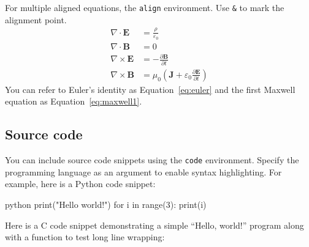 For multiple aligned equations, the \texttt{align} environment. Use \texttt{\&} to mark the alignment point.
\begin{align}
    \label{eq:maxwell1}
    \nabla \cdot \mathbf{E} &= \frac{\rho}{\varepsilon_0} \\
    \label{eq:maxwell2}
    \nabla \cdot \mathbf{B} &= 0 \\
    \label{eq:maxwell3}
    \nabla \times \mathbf{E} &= -\frac{\partial \mathbf{B}}{\partial t} \\
    \label{eq:maxwell4}
    \nabla \times \mathbf{B} &= \mu_0 \left( \mathbf{J} + \varepsilon_0 \frac{\partial \mathbf{E}}{\partial t} \right)
\end{align}
You can refer to Euler's identity as Equation~\ref{eq:euler} and the first Maxwell equation as Equation~\ref{eq:maxwell1}.
\subsection{Source code}
You can include source code snippets using the \texttt{code} environment. Specify the programming language as an argument to enable syntax highlighting. For example, here is a Python code snippet:
\begin{code}{python}
print("Hello world!")
for i in range(3):
    print(i)
\end{code}

Here is a C code snippet demonstrating a simple ``Hello, world!'' program along with a function to test long line wrapping:
